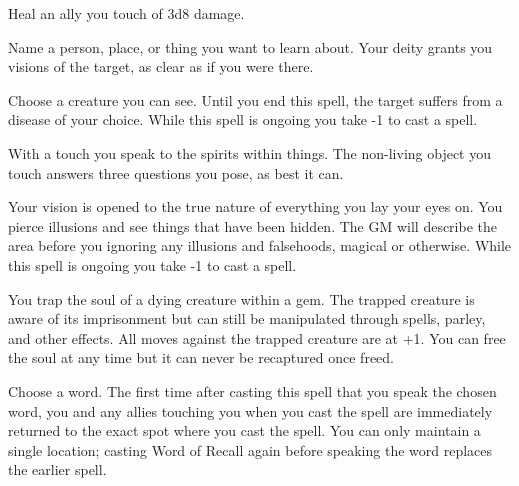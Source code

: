 

Heal an ally you touch of 3d8 damage.



Name a person, place, or thing you want to learn about. Your deity grants you visions of the target, as clear as if you were there.

\newpage
{}


Choose a creature you can see. Until you end this spell, the target suffers from a disease of your choice. While this spell is ongoing you take -1 to cast a spell.



With a touch you speak to the spirits within things. The non-living object you touch answers three questions you pose, as best it can.



Your vision is opened to the true nature of everything you lay your eyes on. You pierce illusions and see things that have been hidden. The GM will describe the area before you ignoring any illusions and falsehoods, magical or otherwise. While this spell is ongoing you take -1 to cast a spell.



You trap the soul of a dying creature within a gem. The trapped creature is aware of its imprisonment but can still be manipulated through spells, parley, and other effects. All moves against the trapped creature are at +1. You can free the soul at any time but it can never be recaptured once freed.



Choose a word. The first time after casting this spell that you speak the chosen word, you and any allies touching you when you cast the spell are immediately returned to the exact spot where you cast the spell. You can only maintain a single location; casting Word of Recall again before speaking the word replaces the earlier spell.

